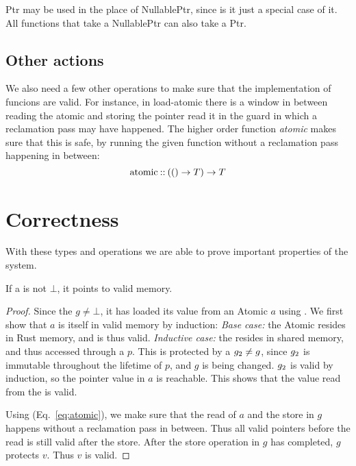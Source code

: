 Ptr may be used in the place of NullablePtr, since is it just a special case of it. All functions
that take a NullablePtr can also take a Ptr.


\subsection{Other actions}

We also need a few other operations to make sure that the implementation of funcions are valid.
For instance, in load-atomic there is a window in between reading the atomic and storing the
pointer read it in the guard in which a reclamation pass may have happened. The higher order
function \emph{atomic} makes sure that this is safe, by running the given function without a
reclamation pass happening in between:
\begin{equation}\label{eq:atomic}
  \text{atomic\:::\:} (() \to T) \to T
\end{equation}


\section{Correctness}

With these types and operations we are able to prove important properties of the system.

\begin{theorem}\label{thm:guard-valid}
  If a  is not $\bot$, it points to valid memory.
\end{theorem}
\begin{proof}
  Since the  $g \neq \bot$, it has loaded its value from an Atomic $a$ using
  .  We first show that $a$ is itself in valid memory by induction: \emph{Base
  case:} the Atomic resides in Rust memory, and is thus valid. \emph{Inductive case:} the
   resides in shared memory, and thus accessed through a  $p$.  This  is
  protected by a  $g\sb{2} \neq g$, since $g\sb{2}$ is immutable throughout the lifetime
  of $p$, and $g$ is being changed. $g\sb{2}$ is valid by induction, so the pointer value in $a$ is
  reachable. This shows that the value read from the  is valid.

  Using  (Eq.~\ref{eq:atomic}), we make sure that the read of $a$ and the store in
  $g$ happens without a reclamation pass in between. Thus all valid pointers before the read is
  still valid after the store. After the store operation in $g$ has completed, $g$ protects $v$.
  Thus $v$ is valid.
\end{proof}

